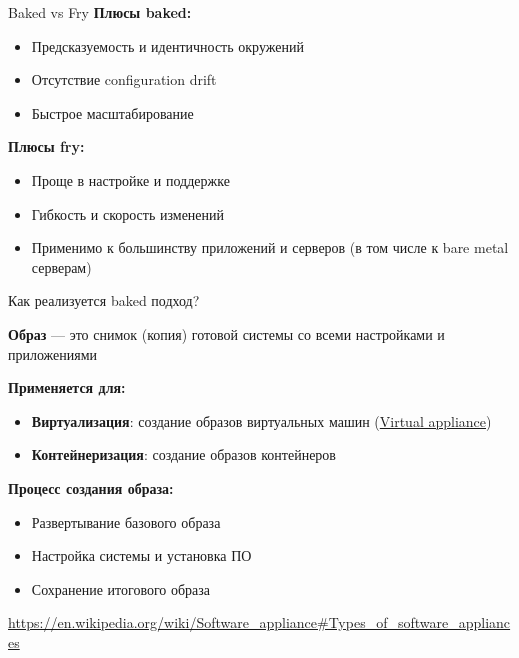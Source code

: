 \documentclass[aspectratio=169]{beamer}
\begin{document}
    \begin{frame}{Baked vs Fry}
        \textbf{Плюсы baked:}
        \vspace{0.2cm}
        \begin{itemize}
            \item Предсказуемость и идентичность окружений
            \item Отсутствие configuration drift
            \item Быстрое масштабирование
        \end{itemize}

        \vspace{0.3cm}
        \textbf{Плюсы fry:}
        \vspace{0.2cm}
        \begin{itemize}
            \item Проще в настройке и поддержке
            \item Гибкость и скорость изменений
            \item Применимо к большинству приложений и серверов (в том числе к bare metal серверам)
        \end{itemize}
    \end{frame}

    \begin{frame}{Как реализуется baked подход?}

        \textbf{Образ} — это снимок (копия) готовой системы со всеми настройками и приложениями

        \textbf{Применяется для:}
        \begin{itemize}
        \item \textbf{Виртуализация}: создание образов виртуальных машин (\href{https://en.wikipedia.org/wiki/Virtual_appliance}{Virtual appliance})
        \item \textbf{Контейнеризация}: создание образов контейнеров
        \end{itemize}

        \textbf{Процесс создания образа:}
        \begin{itemize}
            \item Развертывание базового образа
            \item Настройка системы и установка ПО
            \item Сохранение итогового образа
        \end{itemize}

        \footnotesize{\textcolor{gray}{\url{https://en.wikipedia.org/wiki/Software_appliance\#Types_of_software_appliances}}}
    \end{frame}
\end{document}
